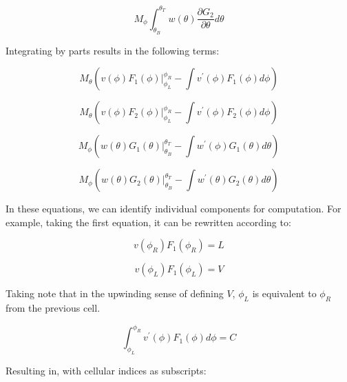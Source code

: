 \documentclass[12pt,a4paper,pagesize=pdftex]{scrartcl}
\begin{document}
{\begin{equation*}
    M_\phi \int_{\theta_B}^{\theta_T} w\left(\theta\right) \frac{\partial G_2}{\partial \theta} d\theta
\end{equation*}

Integrating by parts results in the following terms:

\begin{equation*}
    M_\theta \left(v\left(\phi\right)F_1\left(\phi\right)\rvert_{\phi_L}^{\phi_R} - \int v^\prime\left(\phi\right) F_1\left(\phi\right) d\phi\right)
\end{equation*}

\begin{equation*}
    M_\theta \left(v\left(\phi\right)F_2\left(\phi\right)\rvert_{\phi_L}^{\phi_R} - \int v^\prime\left(\phi\right) F_2\left(\phi\right) d\phi\right)
\end{equation*}

\begin{equation*}
    M_\phi \left(w\left(\theta\right)G_1\left(\theta\right)\rvert_{\theta_B}^{\theta_T} - \int w^\prime\left(\phi\right) G_1\left(\theta\right) d\theta\right)
\end{equation*}

\begin{equation*}
    M_\phi \left(w\left(\theta\right)G_2\left(\theta\right)\rvert_{\theta_B}^{\theta_T} - \int w^\prime\left(\theta\right) G_2\left(\theta\right) d\theta\right)
\end{equation*}

In these equations, we can identify individual components for computation. For example, taking the first equation, it can be rewritten according to:

\begin{equation*}
    v\left(\phi_R\right)F_1\left(\phi_R\right) = L
\end{equation*}

\begin{equation*}
    v\left(\phi_L\right)F_1\left(\phi_L\right) = V
\end{equation*}

Taking note that in the upwinding sense of defining \(V\), \(\phi_L\) is equivalent to \(\phi_R\) from the previous cell.

\begin{equation*}
    \int_{\phi_L}^{\phi_R} v^\prime\left(\phi\right) F_1\left(\phi\right) d\phi = C
\end{equation*}

Resulting in, with cellular indices as subscripts:

}
\end{document}
